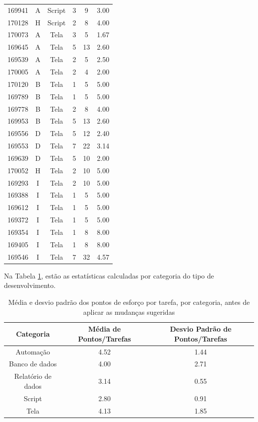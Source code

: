\begin{longtable}{cccccc}
		169941 & A & Script & 3 & 9 & 3.00 \\
		170128 & H & Script & 2 & 8 & 4.00 \\
		170073 & A & Tela & 3 & 5 & 1.67 \\
		169645 & A & Tela & 5 & 13 & 2.60 \\
		169539 & A & Tela & 2 & 5 & 2.50 \\
		170005 & A & Tela & 2 & 4 & 2.00 \\
		170120 & B & Tela & 1 & 5 & 5.00 \\
		169789 & B & Tela & 1 & 5 & 5.00 \\
		169778 & B & Tela & 2 & 8 & 4.00 \\
		169953 & B & Tela & 5 & 13 & 2.60 \\
		169556 & D & Tela & 5 & 12 & 2.40 \\
		169553 & D & Tela & 7 & 22 & 3.14 \\
		169639 & D & Tela & 5 & 10 & 2.00 \\
		170052 & H & Tela & 2 & 10 & 5.00 \\
		169293 & I & Tela & 2 & 10 & 5.00 \\
		169388 & I & Tela & 1 & 5 & 5.00 \\
		169612 & I & Tela & 1 & 5 & 5.00 \\
		169372 & I & Tela & 1 & 5 & 5.00 \\
		169354 & I & Tela & 1 & 8 & 8.00 \\
		169405 & I & Tela & 1 & 8 & 8.00 \\
		169546 & I & Tela & 7 & 32 & 4.57 \\
	\end{longtable}
	
	Na Tabela \ref{tab:media_desvio_historico}, estão as estatísticas calculadas por categoria do tipo de desenvolvimento.

	\begin{table}[!htb]
		\centering
		\begin{tabular}{ccc}
			\toprule
			\textbf{Categoria} & \textbf{Média de Pontos/Tarefas} & \textbf{Desvio Padrão de Pontos/Tarefas} \\
			\midrule
			Automação          & 4.52                             & 1.44                               \\
			Banco de dados     & 4.00                             & 2.71                               \\
			Relatório de dados & 3.14                             & 0.55                               \\
			Script             & 2.80                             & 0.91                               \\
			Tela               & 4.13                             & 1.85                               \\
			\bottomrule
		\end{tabular}
		\caption{Média e desvio padrão dos pontos de esforço por tarefa, por categoria, antes de aplicar as mudanças sugeridas}
		\label{tab:media_desvio_historico}
	\end{table}
	
